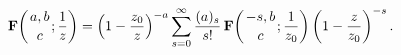 \[\mathop{\mathbf{F}\/}\nolimits\!\left({a,b\atop c};\frac{1}{z}\right)=\left(1-%
\frac{z_{0}}{z}\right)^{-a}\sum_{s=0}^{\infty}\frac{(a)_{s}}{s!}\*\mathop{%
\mathbf{F}\/}\nolimits\!\left({-s,b\atop c};\frac{1}{z_{0}}\right)\left(1-%
\frac{z}{z_{0}}\right)^{-s}.\]